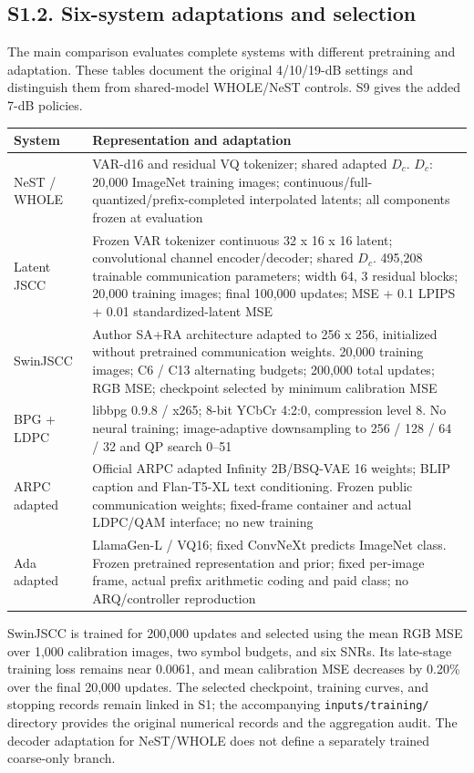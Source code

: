 \clearpage\subsection*{S1.2. Six-system adaptations and selection}
The main comparison evaluates complete systems with different pretraining and adaptation. These tables document the original 4/10/19-dB settings and distinguish them from shared-model WHOLE/NeST controls. S9 gives the added 7-dB policies.
\begin{center}\small\renewcommand{\arraystretch}{1.15}
\begin{tabular}{p{0.95in}p{5.2in}}\toprule
System & Representation and adaptation\\\midrule
NeST / WHOLE & VAR-d16 and residual VQ tokenizer; shared adapted $D_c$. $D_c$: 20,000 ImageNet training images; continuous/full-quantized/prefix-completed interpolated latents; all components frozen at evaluation\\[5pt]
Latent JSCC & Frozen VAR tokenizer continuous 32 x 16 x 16 latent; convolutional channel encoder/decoder; shared $D_c$. 495,208 trainable communication parameters; width 64, 3 residual blocks; 20,000 training images; final 100,000 updates; MSE + 0.1 LPIPS + 0.01 standardized-latent MSE\\[5pt]
SwinJSCC & Author SA+RA architecture adapted to 256 x 256, initialized without pretrained communication weights. 20,000 training images; C6 / C13 alternating budgets; 200,000 total updates; RGB MSE; checkpoint selected by minimum calibration MSE\\[5pt]
BPG + LDPC & libbpg 0.9.8 / x265; 8-bit YCbCr 4:2:0, compression level 8. No neural training; image-adaptive downsampling to 256 / 128 / 64 / 32 and QP search 0--51\\[5pt]
ARPC adapted & Official ARPC adapted Infinity 2B/BSQ-VAE 16 weights; BLIP caption and Flan-T5-XL text conditioning. Frozen public communication weights; fixed-frame container and actual LDPC/QAM interface; no new training\\[5pt]
Ada adapted & LlamaGen-L / VQ16; fixed ConvNeXt predicts ImageNet class. Frozen pretrained representation and prior; fixed per-image frame, actual prefix arithmetic coding and paid class; no ARQ/controller reproduction\\[5pt]
\bottomrule\end{tabular}\end{center}
SwinJSCC is trained for 200,000 updates and selected using the mean RGB MSE over 1,000 calibration images, two symbol budgets, and six SNRs. Its late-stage training loss remains near 0.0061, and mean calibration MSE decreases by 0.20\% over the final 20,000 updates. The selected checkpoint, training curves, and stopping records remain linked in S1; the accompanying \texttt{inputs/training/} directory provides the original numerical records and the aggregation audit. The decoder adaptation for NeST/WHOLE does not define a separately trained coarse-only branch.
